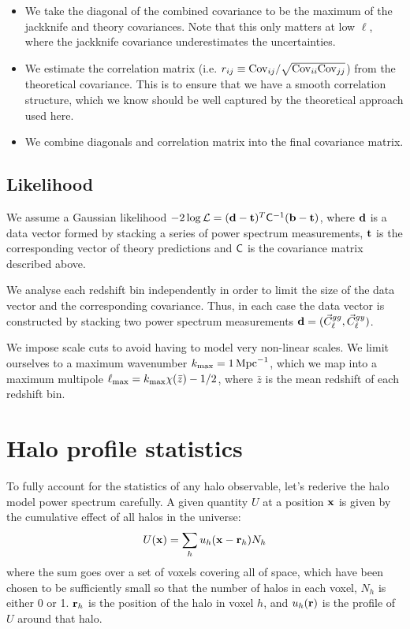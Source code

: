 \documentclass{article}
\begin{document}
\begin{enumerate}
            \begin{itemize}
              \item We take the diagonal of the combined covariance to be the maximum of the jackknife and theory covariances. Note that this only matters at low $\ell$, where the jackknife covariance underestimates the uncertainties.
              \item We estimate the correlation matrix (i.e. $r_{ij}\equiv{\rm Cov}_{ij}/\sqrt{{\rm Cov}_{ii}{\rm Cov}_{jj}}$) from the theoretical covariance. This is to ensure that we have a smooth correlation structure, which we know should be well captured by the theoretical approach used here.
              \item We combine diagonals and correlation matrix into the final covariance matrix.
            \end{itemize}
    \end{enumerate}
  
  \subsection{Likelihood}
    We assume a Gaussian likelihood $-2\log{\cal L}=({\bf d}-{\bf t})^T{\sf C}^{-1}({\bf b}-{\bf t})$, where ${\bf d}$ is a data vector formed by stacking a series of power spectrum measurements, ${\bf t}$ is the corresponding vector of theory predictions and ${\sf C}$ is the covariance matrix described above.
    
    We analyse each redshift bin independently in order to limit the size of the data vector and the corresponding covariance. Thus, in each case the data vector is constructed by stacking two power spectrum measurements ${\bf d}=(\vec{C}^{gg}_\ell,\vec{C}^{gy}_\ell)$.
    
    We impose scale cuts to avoid having to model very non-linear scales. We limit ourselves to a maximum wavenumber $k_{\rm max}=1\,{\rm Mpc}^{-1}$, which we map into a maximum multipole $\ell_{\rm max}=k_{\rm max}\chi(\bar{z})-1/2$, where $\bar{z}$ is the mean redshift of each redshift bin.

  



\appendix
\section{Halo profile statistics}\label{app:hm}
  To fully account for the statistics of any halo observable, let's rederive the halo model power spectrum carefully. A given quantity $U$ at a position ${\bf x}$ is given by the cumulative effect of all halos in the universe:
  \begin{equation}
    U({\bf x})=\sum_h u_h({\bf x}-{\bf r}_h)N_h
  \end{equation}
  where the sum goes over a set of voxels covering all of space, which have been chosen to be sufficiently small so that the number of halos in each voxel, $N_h$ is either 0 or 1. ${\bf r}_h$ is the position of the halo in voxel $h$, and $u_h({\bf r})$ is the profile of $U$ around that halo.
\end{document}
